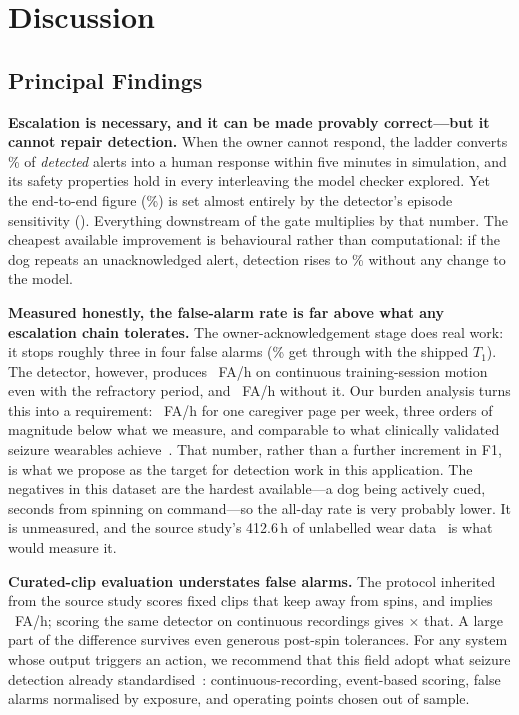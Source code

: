 \section{Discussion}
\label{sec:discussion}

\subsection{Principal Findings}
\textbf{Escalation is necessary, and it can be made provably correct---but it cannot repair detection.} When the owner cannot respond, the ladder converts \% of \emph{detected} alerts into a human response within five minutes in simulation, and its safety properties hold in every interleaving the model checker explored. Yet the end-to-end figure (\%) is set almost entirely by the detector's episode sensitivity (). Everything downstream of the gate multiplies by that number. The cheapest available improvement is behavioural rather than computational: if the dog repeats an unacknowledged alert, detection rises to \% without any change to the model.

\textbf{Measured honestly, the false-alarm rate is far above what any escalation chain tolerates.} The owner-acknowledgement stage does real work: it stops roughly three in four false alarms (\% get through with the shipped $T_1$). The detector, however, produces ~FA/h on continuous training-session motion even with the refractory period, and ~FA/h without it. Our burden analysis turns this into a requirement: ~FA/h for one caregiver page per week, three orders of magnitude below what we measure, and comparable to what clinically validated seizure wearables achieve~\cite{naganur2022meta,meritamlarsen2023nonEEG}. That number, rather than a further increment in F1, is what we propose as the target for detection work in this application. The negatives in this dataset are the hardest available---a dog being actively cued, seconds from spinning on command---so the all-day rate is very probably lower. It is unmeasured, and the source study's 412.6\,h of unlabelled wear data~\cite{brady2025collar} is what would measure it.

\textbf{Curated-clip evaluation understates false alarms.} The protocol inherited from the source study scores fixed clips that keep away from spins, and implies ~FA/h; scoring the same detector on continuous recordings gives $\times$ that. A large part of the difference survives even generous post-spin tolerances. For any system whose output triggers an action, we recommend that this field adopt what seizure detection already standardised~\cite{dan2025szcore,beniczky2018standards}: continuous-recording, event-based scoring, false alarms normalised by exposure, and operating points chosen out of sample.

